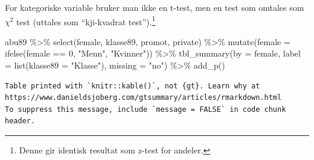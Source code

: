 \documentclass[
  letterpaper,
  DIV=11,
  numbers=noendperiod]{scrreprt}
\newenvironment{Shaded}{\begin{snugshade}}{\end{snugshade}}
\newcommand{\AttributeTok}[1]{\textcolor[rgb]{0.40,0.45,0.13}{#1}}
\newcommand{\DecValTok}[1]{\textcolor[rgb]{0.68,0.00,0.00}{#1}}
\newcommand{\FunctionTok}[1]{\textcolor[rgb]{0.28,0.35,0.67}{#1}}
\newcommand{\NormalTok}[1]{\textcolor[rgb]{0.00,0.23,0.31}{#1}}
\newcommand{\SpecialCharTok}[1]{\textcolor[rgb]{0.37,0.37,0.37}{#1}}
\newcommand{\StringTok}[1]{\textcolor[rgb]{0.13,0.47,0.30}{#1}}
\theoremstyle{definition}
\theoremstyle{remark}
\begin{document}
For kategoriske variable bruker man ikke en t-test, men en test som
omtales som \(\chi^2\) test (uttales som ``kji-kvadrat
test'').\footnote{Denne gir identisk resultat som z-test for andeler.}

\begin{Shaded}
\begin{Highlighting}[]
\NormalTok{abu89 }\SpecialCharTok{\%\textgreater{}\%} 
  \FunctionTok{select}\NormalTok{(female, klasse89, promot, private) }\SpecialCharTok{\%\textgreater{}\%} 
  \FunctionTok{mutate}\NormalTok{(}\AttributeTok{female =} \FunctionTok{ifelse}\NormalTok{(female }\SpecialCharTok{==} \DecValTok{0}\NormalTok{, }\StringTok{"Menn"}\NormalTok{, }\StringTok{"Kvinner"}\NormalTok{)) }\SpecialCharTok{\%\textgreater{}\%} 
    \FunctionTok{tbl\_summary}\NormalTok{(}\AttributeTok{by =}\NormalTok{ female, }
                \AttributeTok{label =} \FunctionTok{list}\NormalTok{(}\AttributeTok{klasse89 =} \StringTok{"Klasse"}\NormalTok{), }
              \AttributeTok{missing =} \StringTok{"no"}\NormalTok{) }\SpecialCharTok{\%\textgreater{}\%} 
  \FunctionTok{add\_p}\NormalTok{() }
\end{Highlighting}
\end{Shaded}

\begin{verbatim}
Table printed with `knitr::kable()`, not {gt}. Learn why at
https://www.danieldsjoberg.com/gtsummary/articles/rmarkdown.html
To suppress this message, include `message = FALSE` in code chunk header.
\end{verbatim}
\end{document}
